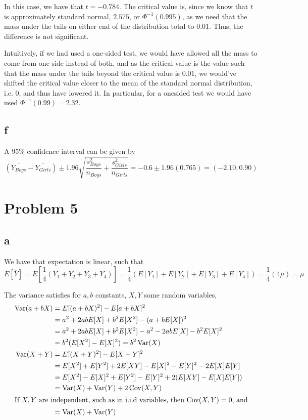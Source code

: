 \documentclass[12pt,letterpaper]{article}
\theoremstyle{definition}
\DeclareMathOperator{\Cov}{Cov}
\DeclareMathOperator{\Var}{Var}
\begin{document}
In this case, we have that $t = -0.784$. The critical value is, since we know that $t$ is approximately standard normal, $2.575$, or $\Phi^{-1}(0.995)$, as we need that the mass under the tails on either end of the distribution total to $0.01$. Thus, the difference is not significant.

Intuitively, if we had used a one-sided test, we would have allowed all the mass to come from one side instead of both, and as the critical value is the value such that the mass under the tails beyond the critical value is $0.01$, we would've shifted the critical value closer to the mean of the standard normal distribution, i.e. 0, and thus have lowered it. In particular, for a onesided test we would have used $\Phi^{-1}(0.99) = 2.32$.

\subsection*{f}

A 95\% confidence interval can be given by
\[
  (\overline{Y_{Boys}} - \overline{Y_{Girls}}) \pm 1.96 \sqrt{\frac{s^{2}_{{Boys}}}{n_{{Boys}}} + \frac{s^{2}_{{Girls}}}{n_{{Girls}}}} = -0.6 \pm 1.96(0.765) = (-2.10, 0.90)
\]

\section*{Problem 5}
\subsection*{a}

We have that expectation is linear, such that 
\[
  E[\overline{Y}] = E\left[ \frac{1}{4}(Y_1 + Y_2 + Y_3 + Y_4)\right] = \frac{1}{4}(E[Y_1] + E[Y_2] + E[Y_3] + E[Y_4]) = \frac{1}{4}(4\mu) = \mu
\]

The variance satisfies for $a, b$ constants, $X, Y$ some random variables, 
\begin{align*}
  \Var(a + bX) &= E[(a+bX)^2] - E[a+bX]^2 \\
               &= a^2 + 2abE[X] + b^2E[X^2] - (a + bE[X])^2 \\
               &= a^2 + 2abE[X] + b^2E[X^2] - a^2 - 2abE[X] - b^2E[X]^2 \\
               &= b^2(E[X^2] - E[X]^2) = b^2\Var(X) \\
  \Var(X+Y) &= E[(X+Y)^2] - E[X+Y]^2 \\
            &= E[X^2] + E[Y^2] + 2E[XY] - E[X]^2 - E[Y]^2 - 2E[X]E[Y] \\
            &= E[X^2] - E[X]^2 + E[Y^2] - E[Y]^2 + 2(E[XY] - E[X]E[Y]) \\
            &= \Var(X) + \Var(Y) + 2\Cov(X,Y) \\
            \intertext{If $X, Y$ are independent, such as in i.i.d variables, then $\Cov(X,Y) = 0$, and}
            &= \Var(X) + \Var(Y)
\end{align*}
\end{document}
